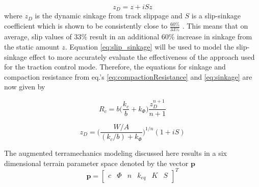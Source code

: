 \begin{equation}\label{eq:slip_sinkage}
    z_D = z + iSz
\end{equation}
where $z_D$ is the dynamic sinkage from track slippage and $S$ is a slip-sinkage coefficient which is shown to be consistently close to $\frac{60\%}{33\%}$ \cite{lyasko2010slip}. This means that on average, slip values of 33\% result in an additional 60\% increase in sinkage from the static amount $z$. Equation \ref{eq:slip_sinkage} will be used to model the slip-sinkage effect to more accurately evaluate the effectiveness of the approach used for the traction control mode. Therefore, the equations for sinkage and compaction resistance from eq.'s \ref{eq:compactionResistance} and \ref{eq:sinkage} are now given by 
\begin{linenomath*}
    \begin{equation}
        R_c = b\bigg(\frac{k_c}{b} + k_\Phi\bigg)\frac{z_D^{n+1}}{n+1}
    \end{equation}
\end{linenomath*}
\begin{linenomath*}
    \begin{equation}
        z_D = \bigg(\frac{W/A}{(k_c/b) + k_\Phi}\bigg)^{1/n} (1 + iS)
    \end{equation}
\end{linenomath*}
The augmented terramechanics modeling discussed here results in a six dimensional terrain parameter space denoted by the vector $\mathbf{p}$
\begin{equation*}
    \mathbf{p} = \begin{bmatrix} c & \Phi & n & k_{eq} & K & S \end{bmatrix}^T
\end{equation*}
